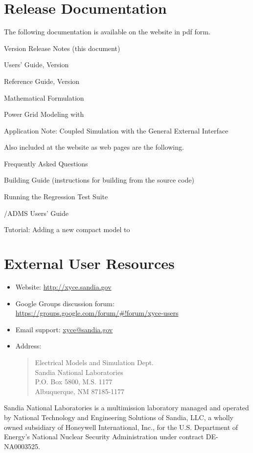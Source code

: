 \documentclass[letterpaper]{scrartcl}
\begin{document}
\section{\Xyce{} Release \XyceVersionVar{} Documentation}
The following \Xyce{} documentation is available on the \Xyce{} website in pdf
form.
\begin{XyceItemize}
  \item \Xyce{} Version \XyceVersionVar{} Release Notes (this document)
  \item \Xyce{} Users' Guide, Version \XyceVersionVar{}
  \item \Xyce{} Reference Guide, Version \XyceVersionVar{}
  \item \Xyce{} Mathematical Formulation
  \item Power Grid Modeling with \Xyce{}
  \item Application Note: Coupled Simulation with the \Xyce{} General
    External Interface
\end{XyceItemize}
Also included at the \Xyce{} website as web pages are the following.
\begin{XyceItemize}
  \item Frequently Asked Questions
  \item Building Guide (instructions for building \Xyce{} from the source code)
  \item Running the \Xyce{} Regression Test Suite
  \item \Xyce{}/ADMS Users' Guide
  \item Tutorial:  Adding a new compact model to \Xyce{}
\end{XyceItemize}


\section{External User Resources}
\begin{itemize}
  \item Website: {\color{XyceDeepRed}\url{http://xyce.sandia.gov}}
  \item Google Groups discussion forum:
    {\color{XyceDeepRed}\url{https://groups.google.com/forum/#!forum/xyce-users}}
  \item Email support:
    {\color{XyceDeepRed}\href{mailto:xyce@sandia.gov}{xyce@sandia.gov}}
  \item Address:
    \begin{quote}
            Electrical Models and Simulation Dept.\\
            Sandia National Laboratories\\
            P.O. Box 5800, M.S. 1177\\
            Albuquerque, NM 87185-1177 \\
    \end{quote}
\end{itemize}

\vspace*{\fill}
\noindent
Sandia National Laboratories is a multimission laboratory managed and
operated by National Technology and Engineering Solutions of Sandia,
LLC, a wholly owned subsidiary of Honeywell International, Inc., for
the U.S. Department of Energy's National Nuclear Security
Administration under contract DE-NA0003525.
\end{document}
